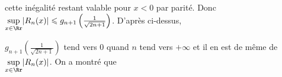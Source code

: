 {\begin{enumerate}
{cette inégalité restant valable pour $x<0$ par parité. Donc $\underset{x\in\Rr}{\text{sup}}|R_n(x)|\leqslant g_{n+1}\left(\frac{1}{\sqrt{2n+1}}\right)$. D'après ci-dessus, 

$g_{n+1}\left(\frac{1}{\sqrt{2n+1}}\right)$ tend vers $0$ quand $n$ tend vers $+\infty$ et il en est de même de $\underset{x\in\Rr}{\text{sup}}|R_n(x)|$. On a montré que

\begin{center}
\end{center}}
\end{enumerate}
}